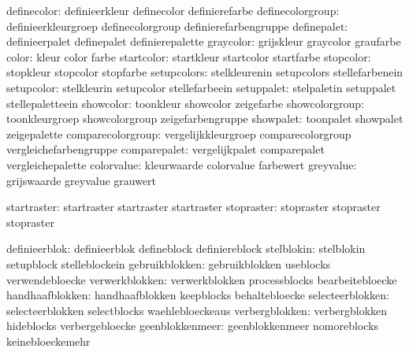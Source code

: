                   definecolor:  definieerkleur               definecolor
                                definierefarbe
             definecolorgroup:  definieerkleurgroep          definecolorgroup
                                definierefarbengruppe
                  definepalet:  definieerpalet               definepalet
                                definierepalette
                    graycolor:  grijskleur                   graycolor
                                graufarbe
                        color:  kleur                        color
                                farbe
                   startcolor:  startkleur                   startcolor
                                startfarbe
                    stopcolor:  stopkleur                    stopcolor
                                stopfarbe
                  setupcolors:  stelkleurenin                setupcolors
                                stellefarbenein
                   setupcolor:  stelkleurin                  setupcolor
                                stellefarbeein
                   setuppalet:  stelpaletin                  setuppalet
                                stellepaletteein
                    showcolor:  toonkleur                    showcolor
                                zeigefarbe
               showcolorgroup:  toonkleurgroep               showcolorgroup
                                zeigefarbengruppe
                    showpalet:  toonpalet                    showpalet
                                zeigepalette
            comparecolorgroup:  vergelijkkleurgroep          comparecolorgroup
                                vergleichefarbengruppe
                 comparepalet:  vergelijkpalet               comparepalet
                                vergleichepalette
                   colorvalue:  kleurwaarde                  colorvalue
                                farbewert
                    greyvalue:  grijswaarde                  greyvalue
                                grauwert

                  startraster:  startraster                  startraster
                                startraster
                   stopraster:  stopraster                   stopraster
                                stopraster

                definieerblok:  definieerblok                defineblock
                                definiereblock
                   stelblokin:  stelblokin                   setupblock
                                stelleblockein
               gebruikblokken:  gebruikblokken               useblocks
                                verwendebloecke
               verwerkblokken:  verwerkblokken               processblocks
                                bearbeitebloecke
              handhaafblokken:  handhaafblokken              keepblocks
                                behaltebloecke
             selecteerblokken:  selecteerblokken             selectblocks
                                waehlebloeckeaus
               verbergblokken:  verbergblokken               hideblocks
                                verbergebloecke
              geenblokkenmeer:  geenblokkenmeer              nomoreblocks
                                keinebloeckemehr

